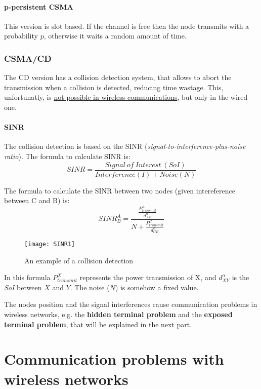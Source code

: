 \paragraph*{p-persistent CSMA} This version is slot based. If the channel is
free then the node transmits with a probability $p$, otherwise it waits a random
amount of time.

\subsubsection{CSMA/CD}

The CD version has a collision detection system, that allows to abort the
transmission when a collision is detected, reducing time wastage. This,
unfortunatly, is \underline{not possible in wireless communications}, but only
in the wired one.

\paragraph*{SINR} The collision detection is based on the SINR
(\textit{signal-to-interference-plus-noise ratio}). The formula to calculate
SINR is:
\begin{equation}
SINR = \frac{Signal\ of\ Interest\ (SoI)}{Interference(I) + Noise(N)}
\end{equation}

The formula to calculate the SINR between two nodes (given intereference between
C and B) is:
\begin{equation}
SINR^{A}_{B} = \frac{\frac{P^{A}_{transmit}}{d^{\alpha}_{AB}}}{N + \frac{P^{C}_{transmit}}{d^{\alpha}_{CB}}}
\end{equation}

\begin{figure}[t]
  \centering
  \texttt{[image: SINR1]}
  \caption{An example of a collision detection}
\end{figure}

In this formula $P^{X}_{transmit}$ represents the power transmission of X, and
$d^{\alpha}_{XY}$ is the \textit{SoI} between $X$ and $Y$. The noise ($N$) is
somehow a fixed value.

The nodes position and the signal interferences cause communication problems in
wireless networks, e.g. the \textbf{hidden terminal problem} and the \textbf{
  exposed terminal problem}, that will be explained in the next part.

\section{Communication problems with wireless networks}

